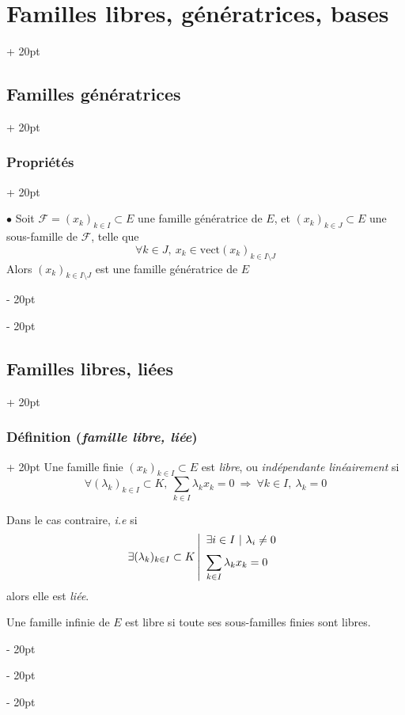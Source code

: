 \documentclass[a4paper, 12pt, twoside]{article}
\newcommand{\ind}[1][20pt]{\advance\leftskip + #1}
\newcommand{\deind}[1][20pt]{\advance\leftskip - #1}
\newenvironment{indt}[2][20pt]{#2 \par \ind[#1]}{\par \deind} %
\begin{document}
\begin{indt}{\section{Familles libres, génératrices, bases}}
\begin{indt}{\subsection{Familles génératrices}}
\begin{indt}{\subsubsection{Propriétés}}
                \vspace{12pt}
                
                $\bullet$ Soit $\mathcal F = (x_k)_{k \in I} \subset E$ une famille génératrice de $E$, et $(x_k)_{k \in J} \subset E$ une sous-famille de $\mathcal F$, telle que
                    \[ \forall k \in J,\ x_k \in \mathrm{vect}(x_k)_{k \in I \setminus J} \]
                Alors $(x_k)_{k \in I \setminus J}$ est une famille génératrice de $E$
            \end{indt}
        \end{indt}
        
        \vspace{12pt}
        
        \begin{indt}{\subsection{Familles libres, liées}}
            \begin{indt}{\subsubsection{Définition (\textit{famille libre, liée})}}
                Une famille finie $(x_k)_{k \in I} \subset E$ est \textit{libre}, ou \textit{indépendante linéairement} si
                    \[ \forall (\lambda_k)_{k \in I} \subset K,\ \sum_{k \in I} \lambda_k x_k = 0\ \Rightarrow\ \forall k \in I,\ \lambda_k = 0 \]
                
                Dans le cas contraire, \textit{i.e} si
                    \[
                        \exists (\lambda_k)_{k \in I} \subset K
                        \left|
                        \begin{array}{l}
                            \exists i \in I\ |\ \lambda_i \neq 0
                            \vspace{6pt}
                            \\
                            \displaystyle \sum_{k \in I} \lambda_k x_k = 0
                        \end{array}
                        \right.
                    \]
                alors elle est \textit{liée}.
                
                \vspace{12pt}
                
                Une famille infinie de $E$ est libre si toute ses sous-familles finies sont libres.
                

\end{indt}
\end{indt}
\end{indt}
\end{document}
